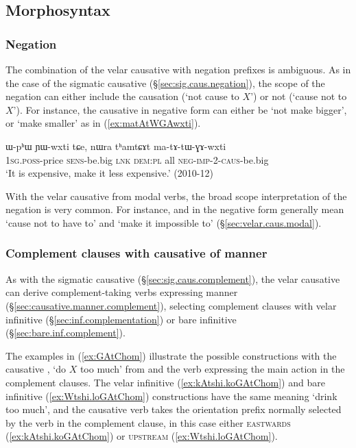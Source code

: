  
\subsection{Morphosyntax} \label{sec:velar.causative.morphosyntax}

\subsubsection{Negation} \label{sec:velar.causative.negation}
The combination of the velar causative with negation prefixes is ambiguous. As in the case of the sigmatic causative (§\ref{sec:sig.caus.negation}), the scope of the negation can either include the causation (`not cause to $X$') or not (`cause not to $X$'). For instance, the causative   in negative form can either be `not make bigger', or  `make smaller' as in (\ref{ex:matAtWGAwxti}).

\begin{exe}
\ex \label{ex:matAtWGAwxti}
\gll  ɯ-pʰɯ ɲɯ-wxti tɕe, nɯra tʰamtɕɤt ma-tɤ-tɯ-ɣɤ-wxti \\
\textsc{1sg}.\textsc{poss}-price \textsc{sens}-be.big \textsc{lnk} \textsc{dem}:\textsc{pl} all \textsc{neg}-\textsc{imp}-2-\textsc{caus}-be.big \\
\glt  `It is expensive, make it less expensive.' (2010-12)
\end{exe} 
 
With the velar causative from modal verbs, the broad scope interpretation of the negation is very common. For instance,   and   in the negative form generally mean `cause not to have to' and `make it impossible to' (§\ref{sec:velar.caus.modal}).
 
\subsubsection{Complement clauses with causative of manner} \label{sec:velar.caus.complement}
As with the sigmatic causative (§\ref{sec:sig.caus.complement}), the velar causative can derive com\-ple\-ment-taking verbs expressing manner (§\ref{sec:causative.manner.complement}), selecting complement clauses with velar infinitive (§\ref{sec:inf.complementation}) or bare infinitive (§\ref{sec:bare.inf.complement}).

The examples in (\ref{ex:GAtChom}) illustrate the possible constructions with the causative , `do $X$ too much' from  and the verb  expressing the main action in the complement clauses. The velar infinitive (\ref{ex:kAtshi.koGAtChom}) and bare infinitive (\ref{ex:Wtshi.loGAtChom}) constructions have the same meaning `drink too much', and the causative verb takes the orientation prefix normally selected by the verb in the complement clause, in this case either \textsc{eastwards} (\ref{ex:kAtshi.koGAtChom}) or \textsc{upstream} (\ref{ex:Wtshi.loGAtChom}). 

